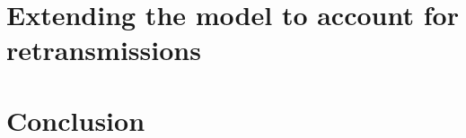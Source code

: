 



\section{Extending the model to account for retransmissions}
\label{sec:4:retransmissions}





\newpage  %
\section{Conclusion}
\label{sec:4:conclusion}




\label{sub:41:conclusion}

